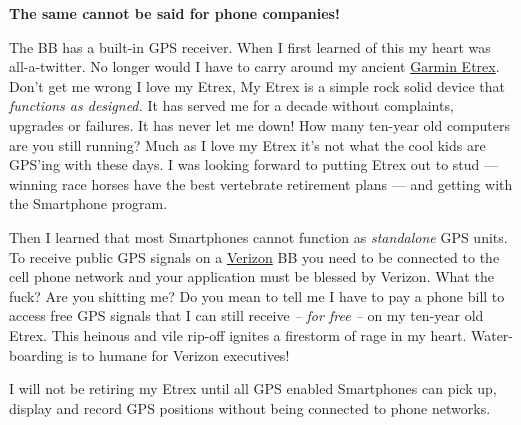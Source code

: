 \textbf{The same cannot be said for phone companies!}

The BB has a built-in GPS receiver. When I first learned of this my
heart was all-a-twitter. No longer would I have to carry around my
ancient \href{http://www.amazon.com/dp/B00003WGP5?tag=helubuy-20}{Garmin
Etrex}. Don't get me wrong I love my Etrex, My Etrex is a simple rock
solid device that \emph{functions as designed.} It has served me for a
decade without complaints, upgrades or failures. It has never let me
down! How many ten-year old computers are you still running? Much as I
love my Etrex it's not what the cool kids are GPS'ing with these days. I
was looking forward to putting Etrex out to stud --- winning race horses
have the best vertebrate retirement plans --- and getting with the
Smartphone program.

Then I learned that most Smartphones cannot function as
\emph{standalone} GPS units. To receive public GPS signals on a
\href{http://www.verizonwireless.com/b2c/index.html}{Verizon} BB you
need to be connected to the cell phone network and your application must
be blessed by Verizon. What the fuck? Are you shitting me? Do you mean
to tell me I have to pay a phone bill to access free GPS signals that I
can still receive \emph{-- for free --} on my ten-year old Etrex. This
heinous and vile rip-off ignites a firestorm of rage in my heart.
Water-boarding is to humane for Verizon executives!

I will not be retiring my Etrex until all GPS enabled Smartphones can
pick up, display and record GPS positions without being connected to
phone networks.




%